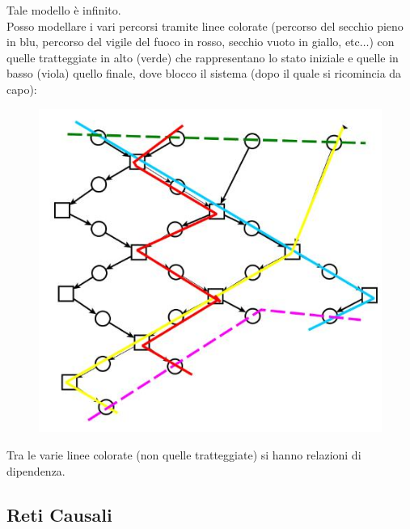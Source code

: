 Tale modello è infinito.\\
\newpage
Posso modellare i vari percorsi tramite linee colorate (percorso del secchio
pieno in blu, percorso del vigile del fuoco in rosso, secchio vuoto in giallo,
etc$\ldots$) con quelle tratteggiate 
in alto (verde) che rappresentano lo stato iniziale e quelle in basso (viola)
quello finale, dove blocco il sistema
(dopo il quale si ricomincia da capo):
\begin{figure}[H]
  \centering
  \includegraphics[scale = 0.5]{img/inc3.jpg} 
\end{figure}
Tra le varie linee colorate (non quelle tratteggiate) si hanno relazioni di
dipendenza. \\
\subsection{Reti Causali}
